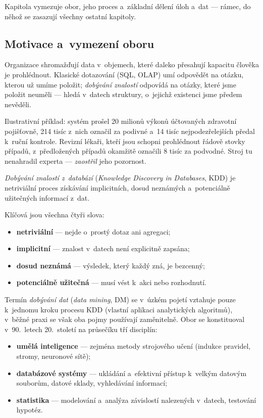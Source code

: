 \documentclass[11pt,a4paper]{article}
\theoremstyle{definition}
\begin{document}
Kapitola vymezuje obor, jeho proces a~základní dělení úloh a~dat --- rámec, do něhož se zasazují
všechny ostatní kapitoly.

\subsection{Motivace a~vymezení oboru}

Organizace shromažďují data v~objemech, které daleko přesahují kapacitu člověka je
prohlédnout. Klasické dotazování (SQL, OLAP) umí odpovědět na otázku, kterou už umíme
položit; \emph{dobývání znalostí} odpovídá na otázky, které jsme položit neuměli --- hledá
v~datech struktury, o~jejichž existenci jsme předem nevěděli.

Ilustrativní příklad: systém prošel 20 milionů výkonů účtovaných zdravotní pojišťovně,
214 tisíc z~nich označil za podivné a~14 tisíc nejpodezřelejších předal k~ruční kontrole.
Revizní lékaři, kteří jsou schopni prohlédnout řádově stovky případů, z~předložených
případů okamžitě označili 8 tisíc za podvodné. Stroj tu nenahradil experta ---
\emph{zaostřil} jeho pozornost.

\begin{defbox}
\emph{Dobývání znalostí z~databází} (\emph{Knowledge Discovery in Databases}, KDD) je
netriviální proces získávání implicitních, dosud neznámých a~potenciálně užitečných
informací z~dat.

Klíčová jsou všechna čtyři slova:
\begin{itemize}
\item \textbf{netriviální} --- nejde o~prostý dotaz ani agregaci;
\item \textbf{implicitní} --- znalost v~datech není explicitně zapsána;
\item \textbf{dosud neznámá} --- výsledek, který každý zná, je bezcenný;
\item \textbf{potenciálně užitečná} --- musí vést k~akci nebo rozhodnutí.
\end{itemize}
\end{defbox}

Termín \emph{dobývání dat} (\emph{data mining}, DM) se v~úzkém pojetí vztahuje pouze
k~jednomu kroku procesu KDD (vlastní aplikaci analytických algoritmů), v~běžné praxi se
však oba pojmy používají zaměnitelně. Obor se konstituoval v~90.~letech 20.~století na
průsečíku tří disciplín:

\begin{itemize}
\item \textbf{umělá inteligence} --- zejména metody strojového učení (indukce pravidel,
      stromy, neuronové sítě);
\item \textbf{databázové systémy} --- ukládání a~efektivní přístup k~velkým datovým
      souborům, datové sklady, vyhledávání informací;
\item \textbf{statistika} --- modelování a~analýza závislostí nalezených v~datech,
      testování hypotéz.
\end{itemize}
\end{document}
